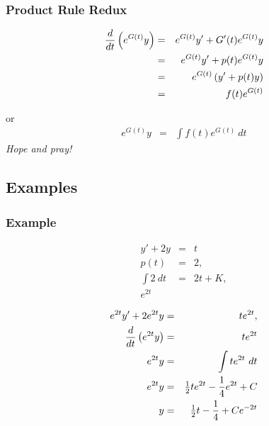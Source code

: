 \begin{frame}
  \frametitle{Product Rule Redux}

  \begin{eqnarray*}
    \frac{d}{dt} \left( e^{G(t)} y \right) & = & e^{G(t)} y' + G'(t) e^{G(t)} y \\
    & = & e^{G(t)} y' + p(t) e^{G(t)} y \\
    & = & e^{G(t)} \left( y' + p(t) y \right) \\
    & = & f(t) e^{G(t)}
  \end{eqnarray*}

  or
  \begin{eqnarray*}
    e^{G(t)} y & = & \int f(t) e^{G(t)} ~ dt
  \end{eqnarray*}
  \textit{Hope and pray!}

\end{frame}


\subsection{Examples}

\begin{frame}
  \frametitle{Example}

  \vspace*{-3em}
  \begin{eqnarray*}
    y' + 2y & = & t \\
    p(t) & = & 2, \\
    \int 2 ~ dt & = & 2t + K, \\
    e^{2t} & & 
  \end{eqnarray*}

  \begin{eqnarray*}
    e^{2t} y' + 2 e^{2t} y & = & t e^{2t}, \\
    \frac{d}{dt} \left( e^{2t} y \right) & = & t e^{2t} \\
    e^{2t} y & = & \int t e^{2t} ~ dt \\
    e^{2t} y & = & \mbox{$\frac{1}{2}$} t e^{2t} - \frac{1}{4} e^{2t} + C \\
    y & = & \mbox{$\frac{1}{2}$} t - \frac{1}{4} + C e^{-2t}
  \end{eqnarray*}

\end{frame}



